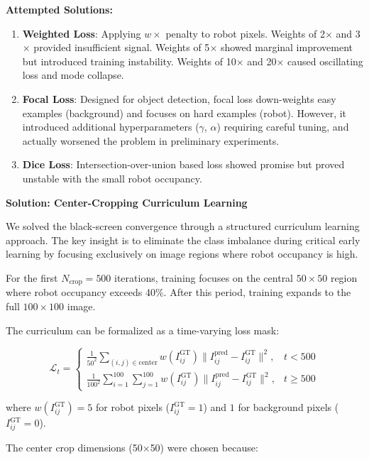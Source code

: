 ﻿\documentclass[12pt,a4paper,oneside]{report}
\begin{document}
\textbf{Attempted Solutions:}

\begin{enumerate}
    \item \textbf{Weighted Loss}: Applying $w \times$ penalty to robot pixels. Weights of 2$\times$ and 3$\times$ provided insufficient signal. Weights of 5$\times$ showed marginal improvement but introduced training instability. Weights of 10$\times$ and 20$\times$ caused oscillating loss and mode collapse.
    \item \textbf{Focal Loss}: Designed for object detection, focal loss down-weights easy examples (background) and focuses on hard examples (robot). However, it introduced additional hyperparameters ($\gamma$, $\alpha$) requiring careful tuning, and actually worsened the problem in preliminary experiments.
    \item \textbf{Dice Loss}: Intersection-over-union based loss showed promise but proved unstable with the small robot occupancy.
\end{enumerate}

\textbf{Solution: Center-Cropping Curriculum Learning}

We solved the black-screen convergence through a structured curriculum learning approach. The key insight is to eliminate the class imbalance during critical early learning by focusing exclusively on image regions where robot occupancy is high.

For the first $N_{\text{crop}} = 500$ iterations, training focuses on the central $50 \times 50$ region where robot occupancy exceeds 40\%. After this period, training expands to the full $100 \times 100$ image.

The curriculum can be formalized as a time-varying loss mask:

\begin{equation}
\mathcal{L}_t = \begin{cases}
\frac{1}{50^2} \sum_{(i,j) \in \text{center}} w(I_{ij}^{\text{GT}}) \|I_{ij}^{\text{pred}} - I_{ij}^{\text{GT}}\|^2, & t < 500 \\
\frac{1}{100^2} \sum_{i=1}^{100}\sum_{j=1}^{100} w(I_{ij}^{\text{GT}}) \|I_{ij}^{\text{pred}} - I_{ij}^{\text{GT}}\|^2, & t \geq 500
\end{cases}
\end{equation}

where $w(I_{ij}^{\text{GT}}) = 5$ for robot pixels ($I_{ij}^{\text{GT}} = 1$) and $1$ for background pixels ($I_{ij}^{\text{GT}} = 0$).

The center crop dimensions (50$\times$50) were chosen because:
\end{document}
